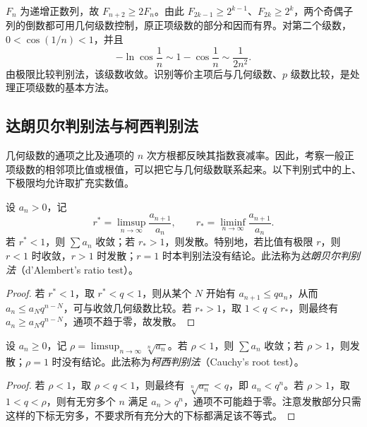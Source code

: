 \begin{solve}
$F_n$ 为递增正数列，故 $F_{n+2}\geq2F_n$。由此 $F_{2k-1}\geq2^{k-1}$、$F_{2k}\geq2^k$，两个奇偶子列的倒数都可用几何级数控制，原正项级数的部分和因而有界。对第二个级数，$0<\cos(1/n)<1$，并且
\[
    -\ln\cos\frac1n
    \sim1-\cos\frac1n\sim\frac1{2n^2}.
\]
由极限比较判别法，该级数收敛。识别等价主项后与几何级数、$p$ 级数比较，是处理正项级数的基本方法。
\end{solve}

\subsection{达朗贝尔判别法与柯西判别法}
\label{subsec:dalembert-and-cauchy-tests}

几何级数的通项之比及通项的 $n$ 次方根都反映其指数衰减率。因此，考察一般正项级数的相邻项比值或根值，可以把它与几何级数联系起来。以下判别式中的上、下极限均允许取扩充实数值。

\begin{theorem}[达朗贝尔比值判别法]
\label{thm:dalembert-ratio-test}
设 $a_n>0$，记
\[
    r^*=\limsup_{n\to\infty}\frac{a_{n+1}}{a_n},\qquad
    r_*=\liminf_{n\to\infty}\frac{a_{n+1}}{a_n}.
\]
若 $r^*<1$，则 $\sum a_n$ 收敛；若 $r_*>1$，则发散。特别地，若比值有极限 $r$，则 $r<1$ 时收敛，$r>1$ 时发散；$r=1$ 时本判别法没有结论。此法称为\emph{达朗贝尔判别法}（d'Alembert's ratio test）。
\end{theorem}

\begin{proof}
若 $r^*<1$，取 $r^*<q<1$，则从某个 $N$ 开始有 $a_{n+1}\leq qa_n$，从而 $a_n\leq a_Nq^{n-N}$，可与收敛几何级数比较。若 $r_*>1$，取 $1<q<r_*$，则最终有 $a_n\geq a_Nq^{n-N}$，通项不趋于零，故发散。
\end{proof}

\begin{theorem}[柯西根值判别法]
\label{thm:cauchy-root-test}
设 $a_n\geq0$，记 $\rho=\limsup_{n\to\infty}\sqrt[n]{a_n}$。若 $\rho<1$，则 $\sum a_n$ 收敛；若 $\rho>1$，则发散；$\rho=1$ 时没有结论。此法称为\emph{柯西判别法}（Cauchy's root test）。
\end{theorem}

\begin{proof}
若 $\rho<1$，取 $\rho<q<1$，则最终有 $\sqrt[n]{a_n}<q$，即 $a_n<q^n$。若 $\rho>1$，取 $1<q<\rho$，则有无穷多个 $n$ 满足 $a_n>q^n$，通项不可能趋于零。注意发散部分只需这样的下标无穷多，不要求所有充分大的下标都满足该不等式。
\end{proof}

